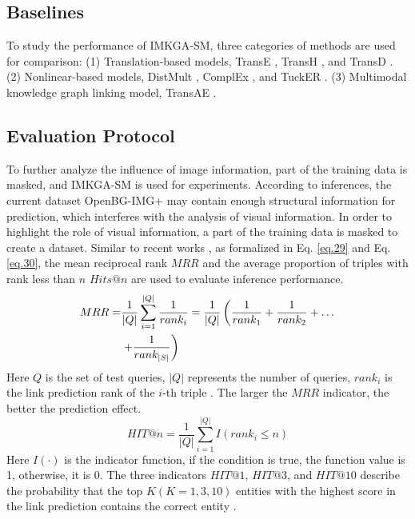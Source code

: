 \documentclass[10pt,journal,compsoc]{IEEEtran}
\begin{document}
\subsection{Baselines}
To study the performance of IMKGA-SM, three categories of methods are used for comparison: (1) Translation-based models, TransE \cite{ref1}, TransH \cite{ref5}, and TransD \cite{ref66}. (2) Nonlinear-based models, DistMult \cite{ref22}, ComplEx \cite{ref16}, and TuckER \cite{ref7}. (3) Multimodal knowledge graph linking model, TransAE \cite{ref14}.

\subsection{Evaluation Protocol}
To further analyze the influence of image information, part of the training data is masked, and IMKGA-SM is used for experiments. According to inferences, the current dataset OpenBG-IMG+ may contain enough structural information for prediction, which interferes with the analysis of visual information. In order to highlight the role of visual information, a part of the training data is masked to create a dataset. Similar to recent works \cite{ref8} \cite{ref9}, as formalized in Eq. \ref{eq.29} and Eq. \ref{eq.30}, the mean reciprocal rank $MRR$ and the average proportion of triples with rank less than $n$ $Hits@n$ are used to evaluate inference performance.
\begin{equation}\label{eq.29}
\begin{aligned}
MRR = & \frac{1}{{\left| Q \right|}}\sum\limits_{i = 1}^{\left| Q \right|} {\frac{1}{{ran{k_i}}}}  = \frac{1}{{\left| Q \right|}}\left( {\frac{1}{{ran{k_1}}} + \frac{1}{{ran{k_2}}} +  \ldots } \right.\hfill \\
&  \left. { + \frac{1}{{ran{k_{\left| S \right|}}}}} \right) \hfill \\
\end{aligned}
\end{equation}
Here $Q$ is the set of test queries, $|Q|$ represents the number of queries, $rank_i$ is the link prediction rank of the $i$-th triple \cite{ref44}. The larger the $MRR$ indicator, the better the prediction effect.
\begin{equation}\label{eq.30}
HIT@n = \frac{1}{{\left| Q \right|}}\sum\limits_{i = 1}^{\left| Q \right|} {I\left( {ran{k_i} \leqslant n} \right)} 
\end{equation}
Here $I\left(  \cdot  \right)$ is the indicator function, if the condition is true, the function value is 1, otherwise, it is 0. The three indicators $HIT@1$, $HIT@3$, and $HIT@10$ describe the probability that the top $K(K=1,3,10)$ entities with the highest score in the link prediction contains the correct entity \cite{ref1}.
\end{document}
